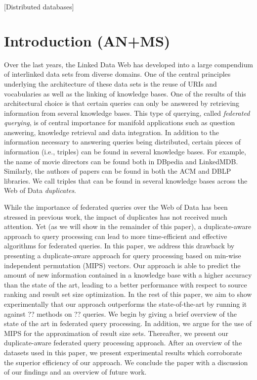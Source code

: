 \documentclass{sig-alternate}  %
\begin{document}
[Distributed databases]



\section{Introduction (AN+MS)}
Over the last years, the Linked Data Web has developed into a large compendium of interlinked data sets from diverse domains. 
One of the central principles underlying the architecture of these data sets is the reuse of URIs and vocabularies as well as the linking of knowledge bases.
One of the results of this architectural choice is that certain queries can only be answered by retrieving information from several knowledge bases.
This type of querying, called \emph{federated querying}, is of central importance for manifold applications such as question answering, knowledge retrieval and data integration.
In addition to the information necessary to answering queries being distributed, certain pieces of information (i.e., triples) can be found in several knowledge bases. 
For example, the name of movie directors can be found both in DBpedia and LinkedMDB.
Similarly, the authors of papers can be found in both the ACM and DBLP libraries.
We call triples that can be found in several knowledge bases across the Web of Data \emph{duplicates}.

While the importance of federated queries over the Web of Data has been stressed in previous work, the impact of duplicates has not received much attention.
Yet (as we will show in the remainder of this paper), a duplicate-aware approach to query processing can lead to more time-efficient and effective algorithms for federated queries.
In this paper, we address this drawback by presenting a duplicate-aware approach for query processing based on min-wise independent permutation (MIPS) vectors.
Our approach is able to predict the amount of new information contained in a knowledge base with a higher accuracy than the state of the art, leading to a better performance with respect to source ranking and result set size optimization. 
In the rest of this paper, we aim to show experimentally that our approach outperforms the state-of-the-art by running it against ?? methods on ?? queries. 
We begin by giving a brief overview of the state of the art in federated query processing.
In addition, we argue for the use of MIPS for the approximation of result size sets.
Thereafter, we present our duplicate-aware federated query processing approach.
After an overview of the datasets used in this paper, we present experimental results which corroborate the superior efficiency of our approach.
We conclude the paper with a discussion of our findings and an overview of future work.
\end{document}
